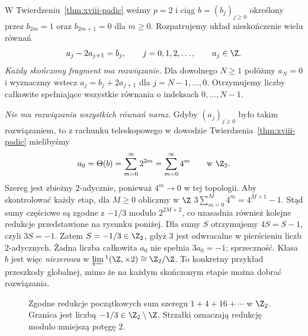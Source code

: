 \begin{przyklad}
\label{prz:xviii-lim1-2adic-audit}
W Twierdzeniu~\ref{thm:xviii-padic} weźmy $p=2$
i ciąg $b=(b_j)_{j\ge0}$ określony przez
$b_{2m}=1$ oraz $b_{2m+1}=0$ dla $m\ge0$.
Rozpatrujemy układ nieskończenie wielu równań
\[
 a_j-2a_{j+1}=b_j,\qquad j=0,1,2,\ldots,
 \qquad a_j\in\Z.
\]
\emph{Każdy skończony fragment ma rozwiązanie.}
Dla dowolnego $N\ge1$ połóżmy $a_N=0$ i wyznaczmy
wstecz $a_j=b_j+2a_{j+1}$ dla $j=N-1,\ldots,0$.
Otrzymujemy liczby całkowite spełniające
wszystkie równania o indeksach $0,\ldots,N-1$.

\emph{Nie ma rozwiązania wszystkich równań naraz.}
Gdyby $(a_j)_{j\ge0}$ było takim rozwiązaniem,
to z rachunku teleskopowego w dowodzie
Twierdzenia~\ref{thm:xviii-padic} mielibyśmy
\[
 a_0=\Theta(b)=\sum_{m=0}^{\infty}2^{2m}
 =\sum_{m=0}^{\infty}4^m\qquad\text{w }\Z_2.
\]
Szereg jest zbieżny $2$-adycznie, ponieważ
$4^m\to0$ w tej topologii. Aby skontrolować
każdy etap, dla $M\ge0$ obliczmy w $\Z$
$3\sum_{m=0}^M4^m=4^{M+1}-1$.
Stąd sumy częściowe są zgodne z $-1/3$
modulo $2^{2M+2}$, co uzasadnia również
kolejne redukcje przedstawione na rysunku poniżej.
Dla sumy $S$ otrzymujemy $4S=S-1$,
czyli $3S=-1$.
Zatem $S=-1/3\in\Z_2$, gdyż $3$ jest
odwracalne w pierścieniu liczb $2$-adycznych.
Żadna liczba całkowita $a_0$ nie spełnia
$3a_0=-1$; sprzeczność.
Klasa $b$ jest więc \emph{niezerowa} w
$\varprojlim{}^1(\Z,\times2)\cong\Z_2/\Z$.
To konkretny przykład przeszkody globalnej,
mimo że na każdym skończonym etapie można
dobrać rozwiązania.
\end{przyklad}

\begin{figure}[htbp]
\centering
{}
\caption{Zgodne redukcje początkowych sum szeregu
$1+4+16+\cdots$ w $\Z_2$.
Granica jest liczbą $-1/3\in\Z_2\setminus\Z$.
Strzałki oznaczają redukcję modulo mniejszą potęgę $2$.}
\label{fig:xviii-lim1-2adic-audit}
\end{figure}

